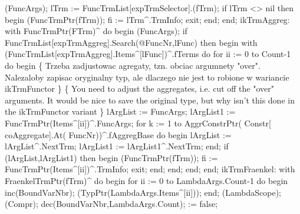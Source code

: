               (FuncArgs);
              lTrm := FuncTrmList[expTrmSelector].(fTrm);
              if lTrm <> nil then
              begin
                 (FuncTrmPtr(fTrm));
                 fi := lTrm^.TrmInfo;
                 exit;
              end;
           end;
        ikTrmAggreg:
           with FuncTrmPtr(FTrm)^ do
           begin
              (FuncArgs);
              if FuncTrmList[expTrmAggreg].Search(@FuncNr,lFunc) then
              begin
                 with (FuncTrmList[expTrmAggreg].Items^[lFunc])^.fTerms do
                    for ii := 0 to Count-1 do
                    begin
                       \{ Trzeba zadjustowac agregaty, tzn. obciac argumnety "over".
                       Nalezaloby zapisac oryginalny typ, ale dlaczego nie jest
                       to robione w wariancie ikTrmFunctor
                       \}
                       \{ You need to adjust the aggregates, i.e. cut off the "over" arguments.
                       It would be nice to save the original type, but why isn't this done in the ikTrmFunctor variant \}
                       lArgList := FuncArgs;
                       lArgList1 := FuncTrmPtr(Items^[ii])^.FuncArgs;
                       for k := 1 to AggrConstrPtr( Constr[ coAggregate].At( FuncNr))^.fAggregBase do
                       begin
                          lArgList := lArgList^.NextTrm;
                          lArgList1 := lArgList1^.NextTrm;
                       end;
                       if (lArgList,lArgList1) then
                       begin
                          (FuncTrmPtr(fTrm));
                          fi := FuncTrmPtr(Items^[ii])^.TrmInfo;
                          exit;
                       end;
                    end;
              end;
           end;
        ikTrmFraenkel:
           with FraenkelTrmPtr(fTrm)^ do
           begin
              for ii := 0 to LambdaArgs.Count-1 do
              begin
                 inc(BoundVarNbr);
                 (TypPtr(LambdaArgs.Items^[ii]));
              end;
              (LambdaScope);
              (Compr);
              dec(BoundVarNbr,LambdaArgs.Count);
               := false;
